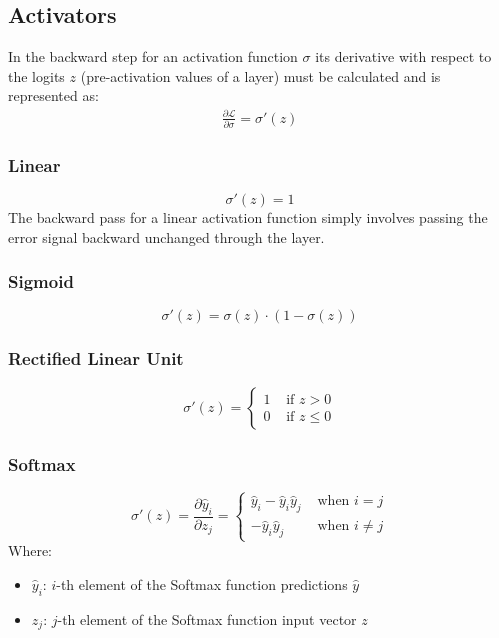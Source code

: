 \documentclass[a4paper]{report}
\newcommand{\haty}{\hat{y}}
\newcommand{\ELL}{\mathcal{L}}
\begin{document}
\subsection{Activators}
In the backward step for an activation function $\sigma$ its derivative with respect to the logits $z$ (pre-activation values of a layer) must be calculated and is represented as:
\begin{align*}
    \frac{\partial\ELL}{\partial\sigma} = \sigma'(z)
\end{align*}

\subsubsection*{Linear}
\begin{equation*}
    \sigma'(z) = 1
\end{equation*}
The backward pass for a linear activation function simply involves passing the error signal backward unchanged through the layer.

\subsubsection*{Sigmoid}
\begin{equation*}
    \sigma'(z) = \sigma(z) \cdot (1-\sigma(z))
\end{equation*}

\subsubsection*{Rectified Linear Unit}
\begin{equation*}
    \sigma'(z) = \begin{cases}
        1 & \text{ if } z > 0\\
        0 & \text{ if } z \leq 0
    \end{cases}
\end{equation*}

\subsubsection*{Softmax}
\begin{equation*}
    \sigma'(z) = \frac{\partial \haty_i}{\partial z_j} = \begin{cases}
        \haty_i-\haty_i\haty_j & \text{ when } i  =  j \\
               -\haty_i\haty_j & \text{ when } i\neq j
    \end{cases}
\end{equation*}
Where:
\begin{itemize}
    \item $\haty_i$: $i$-th element of the Softmax function predictions $\haty$
    \item $z_j$: $j$-th element of the Softmax function input vector $z$
\end{itemize}
\end{document}
